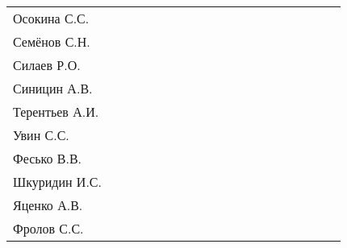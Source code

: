 \documentclass[a4paper,11pt]{article}
\newcommand*\ok{&{\small \ding{51}}} %
\newcommand*\no{&{\small }} %
\begin{document}
\begin{tabular}{l|cccccccccccccccccc}
Осокина С.С.    \ok\ok\ok\ok\no&&&&&&&&&&&&&\\
Семёнов С.Н.    \ok\ok\ok\ok\ok&&&&&&&&&&&&&\\
Силаев Р.О.     \ok\ok\no\no\no&&&&&&&&&&&&&\\
Синицин А.В.    \ok\ok\no\ok\no&&&&&&&&&&&&&\\
Терентьев А.И.  \ok\ok\ok\ok\no&&&&&&&&&&&&&\\
Увин С.С.       \ok\ok\ok\ok\ok&&&&&&&&&&&&&\\
Фесько В.В.     \no\no\no\no\no&&&&&&&&&&&&&\\
Шкуридин И.С.   \ok\ok\ok\ok\ok&&&&&&&&&&&&&\\
Яценко А.В.     \ok\ok\ok\ok\ok&&&&&&&&&&&&&\\
Фролов С.С.     \ok\ok\ok\ok\ok&&&&&&&&&&&&&\\ 
\bottomrule
\end{tabular} 
\end{document}
